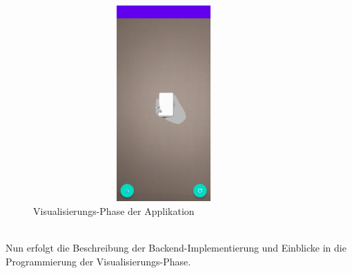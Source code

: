 \begin{figure}[hbt!]
    \centering
    \includegraphics[width=10cm,height=7.5cm,keepaspectratio]{4Umsetzung/Bilder/visual-phase.jpg}
    \caption{Visualisierungs-Phase der Applikation}
    \label{pic:visual}
\end{figure} 
\\
Nun erfolgt die Beschreibung der Backend-Implementierung und Einblicke in die Programmierung der Visualisierungs-Phase.  
